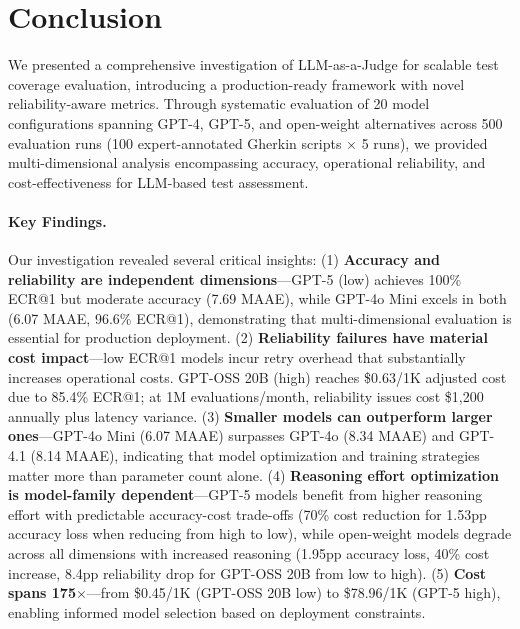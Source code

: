 \documentclass[letterpaper]{article} %
\begin{document}

\section{Conclusion}

We presented a comprehensive investigation of LLM-as-a-Judge for scalable test coverage evaluation, introducing a production-ready framework with novel reliability-aware metrics. Through systematic evaluation of 20 model configurations spanning GPT-4, GPT-5, and open-weight alternatives across 500 evaluation runs (100 expert-annotated Gherkin scripts $\times$ 5 runs), we provided multi-dimensional analysis encompassing accuracy, operational reliability, and cost-effectiveness for LLM-based test assessment.

\paragraph{Key Findings.} Our investigation revealed several critical insights: (1) \textbf{Accuracy and reliability are independent dimensions}---GPT-5 (low) achieves 100\% ECR@1 but moderate accuracy (7.69 MAAE), while GPT-4o Mini excels in both (6.07 MAAE, 96.6\% ECR@1), demonstrating that multi-dimensional evaluation is essential for production deployment. (2) \textbf{Reliability failures have material cost impact}---low ECR@1 models incur retry overhead that substantially increases operational costs. GPT-OSS 20B (high) reaches \$0.63/1K adjusted cost due to 85.4\% ECR@1; at 1M evaluations/month, reliability issues cost \$1,200 annually plus latency variance. (3) \textbf{Smaller models can outperform larger ones}---GPT-4o Mini (6.07 MAAE) surpasses GPT-4o (8.34 MAAE) and GPT-4.1 (8.14 MAAE), indicating that model optimization and training strategies matter more than parameter count alone. (4) \textbf{Reasoning effort optimization is model-family dependent}---GPT-5 models benefit from higher reasoning effort with predictable accuracy-cost trade-offs (70\% cost reduction for 1.53pp accuracy loss when reducing from high to low), while open-weight models degrade across all dimensions with increased reasoning (1.95pp accuracy loss, 40\% cost increase, 8.4pp reliability drop for GPT-OSS 20B from low to high). (5) \textbf{Cost spans 175$\times$}---from \$0.45/1K (GPT-OSS 20B low) to \$78.96/1K (GPT-5 high), enabling informed model selection based on deployment constraints.
\end{document}
